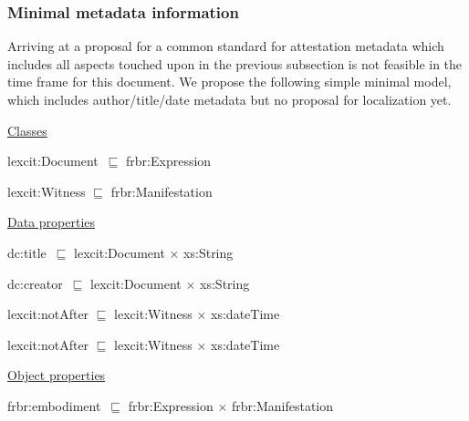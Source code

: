 \documentclass[10pt]{article}
\begin{document}
\subsubsection*{Minimal metadata information}


Arriving at a proposal for a common standard for attestation metadata which includes all aspects touched upon in the previous subsection is not feasible in the time frame for this document. We propose the following simple minimal model, which includes author/title/date metadata but no proposal for localization yet.


\bigskip


{\fontsize{9pt}{10.8pt}\selectfont 
\uline{Classes}

lexcit:Document\  $\sqsubseteq$  frbr:Expression

lexcit:Witness $\sqsubseteq$  frbr:Manifestation




 \uline{Data properties}

dc:title\  $\sqsubseteq$  lexcit:Document $ \times $  xs:String

dc:creator\  $\sqsubseteq$  lexcit:Document $ \times $  xs:String

lexcit:notAfter $\sqsubseteq$  lexcit:Witness $ \times $  xs:dateTime

lexcit:notAfter $\sqsubseteq$  lexcit:Witness $ \times $  xs:dateTime





\uline{Object properties}

frbr:embodiment\   $\sqsubseteq$  frbr:Expression $ \times $  frbr:Manifestation
}


\par














\newpage












\setlength{\parskip}{15.0pt}

\end{document}
